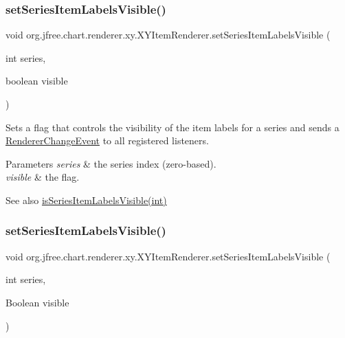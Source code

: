 \subsubsection{\texorpdfstring{set\+Series\+Item\+Labels\+Visible()}{setSeriesItemLabelsVisible()}\hspace{0.1cm}{\footnotesize\ttfamily [1/3]}}
{\footnotesize\ttfamily void org.\+jfree.\+chart.\+renderer.\+xy.\+X\+Y\+Item\+Renderer.\+set\+Series\+Item\+Labels\+Visible (\begin{DoxyParamCaption}\item[{int}]{series,  }\item[{boolean}]{visible }\end{DoxyParamCaption})}

Sets a flag that controls the visibility of the item labels for a series and sends a \mbox{\hyperlink{}{Renderer\+Change\+Event}} to all registered listeners.


\begin{DoxyParams}{Parameters}
{\em series} & the series index (zero-\/based). \\
\hline
{\em visible} & the flag.\\
\hline
\end{DoxyParams}
\begin{DoxySeeAlso}{See also}
\mbox{\hyperlink{interfaceorg_1_1jfree_1_1chart_1_1renderer_1_1xy_1_1_x_y_item_renderer_a29dbe1dc22ee0ca0c7bd5f8e55f89179}{is\+Series\+Item\+Labels\+Visible(int)}} 
\end{DoxySeeAlso}
\mbox{\label{interfaceorg_1_1jfree_1_1chart_1_1renderer_1_1xy_1_1_x_y_item_renderer_a4b91b18aff9150ed864601e3a10d41f5}} 
\subsubsection{\texorpdfstring{set\+Series\+Item\+Labels\+Visible()}{setSeriesItemLabelsVisible()}\hspace{0.1cm}{\footnotesize\ttfamily [2/3]}}
{\footnotesize\ttfamily void org.\+jfree.\+chart.\+renderer.\+xy.\+X\+Y\+Item\+Renderer.\+set\+Series\+Item\+Labels\+Visible (\begin{DoxyParamCaption}\item[{int}]{series,  }\item[{Boolean}]{visible }\end{DoxyParamCaption})}

